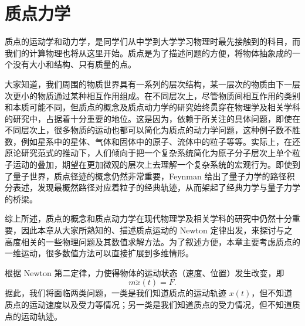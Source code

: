 \chapter{质点力学}
\label{chap:particle-mechanics}

质点的运动学和动力学，是同学们从中学到大学学习物理时最先接触到的科目，而我们的计算物理也将从这里开始。质点是为了描述问题的方便，将物体抽象成的一个没有大小和结构、只有质量的点。

大家知道，我们周围的物质世界具有一系列的层次结构，某一层次的物质由下一层次更小的物质通过某种相互作用组成。在不同层次上，尽管物质间相互作用的类别和本质可能不同，但质点的概念及质点动力学的研究始终贯穿在物理学及相关学科的研究中，占据着十分重要的地位。这是因为，依赖于所关注的具体问题，即使在不同层次上，很多物质的运动也都可以简化为质点的动力学问题，这种例子数不胜数，例如星系中的星体、气体和固体中的原子、流体中的粒子等等。实际上，在还原论研究范式的推动下，人们倾向于把一个复杂系统简化为原子分子层次上单个粒子运动的叠加，期望在更加微观的层次上去理解一个复杂系统的宏观行为。即使到了量子世界，质点径迹的概念仍然非常重要，Feynman 给出了量子力学的路径积分表述，发现最概然路径对应着粒子的经典轨迹，从而架起了经典力学与量子力学的桥梁。

综上所述，质点的概念和质点动力学在现代物理学及相关学科的研究中仍然十分重要，因此本章从大家所熟知的、描述质点运动的 Newton 定律出发，来探讨与之高度相关的一些物理问题及其数值求解方法。为了叙述方便，本章主要考虑质点的一维运动，很多数值方法可以直接扩展到多维情形。

根据 Newton 第二定律，力使得物体的运动状态（速度、位置）发生改变，即
\begin{equation}
 m\ddot{x}(t)=F.
\tag{2.0.1}
\end{equation}
据此，我们将面临两类问题，一类是我们知道质点的运动轨迹 $x(t)$，但不知道质点的运动速度以及受力等情况；另一类是我们知道质点的受力情况，但不知道质点的运动轨迹。


